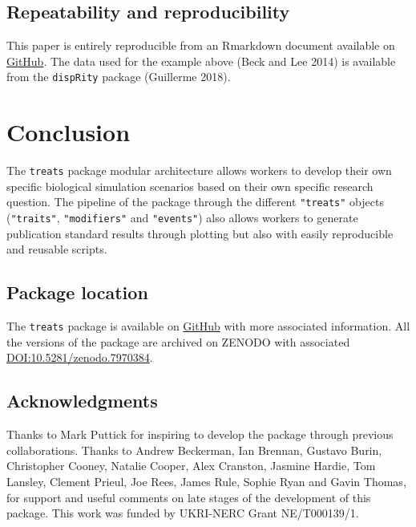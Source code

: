 \documentclass[
]{article}
\begin{document}
\hypertarget{repeatability-and-reproducibility}{%
\subsection{Repeatability and
reproducibility}\label{repeatability-and-reproducibility}}

This paper is entirely reproducible from an Rmarkdown document available
on \href{https://github.com/TGuillerme/treats/paper/}{GitHub}. The data
used for the example above (Beck and Lee 2014) is available from the
\texttt{dispRity} package (Guillerme 2018).

\hypertarget{conclusion}{%
\section{Conclusion}\label{conclusion}}

The \texttt{treats} package modular architecture allows workers to
develop their own specific biological simulation scenarios based on
their own specific research question. The pipeline of the package
through the different \texttt{"treats"} objects (\texttt{"traits"},
\texttt{"modifiers"} and \texttt{"events"}) also allows workers to
generate publication standard results through plotting but also with
easily reproducible and reusable scripts.

\hypertarget{package-location}{%
\subsection{Package location}\label{package-location}}

The \texttt{treats} package is available on
\href{https://github.com/TGuillerme/treats}{GitHub} with more associated
information. All the versions of the package are archived on ZENODO with
associated
\href{https://doi.org/10.5281/zenodo.7970384}{DOI:10.5281/zenodo.7970384}.

\hypertarget{acknowledgments}{%
\subsection{Acknowledgments}\label{acknowledgments}}

Thanks to Mark Puttick for inspiring to develop the package through
previous collaborations. Thanks to Andrew Beckerman, Ian Brennan,
Gustavo Burin, Christopher Cooney, Natalie Cooper, Alex Cranston,
Jasmine Hardie, Tom Lansley, Clement Prieul, Joe Rees, James Rule,
Sophie Ryan and Gavin Thomas, for support and useful comments on late
stages of the development of this package. This work was funded by
UKRI-NERC Grant NE/T000139/1.
\end{document}
